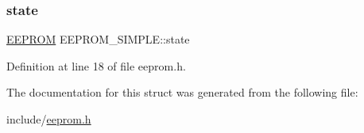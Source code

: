\subsubsection{\texorpdfstring{state}{state}}
{\footnotesize\ttfamily \mbox{\hyperlink{structEEPROM}{E\+E\+P\+R\+OM}} E\+E\+P\+R\+O\+M\+\_\+\+S\+I\+M\+P\+L\+E\+::state}



Definition at line 18 of file eeprom.\+h.



The documentation for this struct was generated from the following file\+:\begin{DoxyCompactItemize}
\item 
include/\mbox{\hyperlink{eeprom_8h}{eeprom.\+h}}\end{DoxyCompactItemize}
